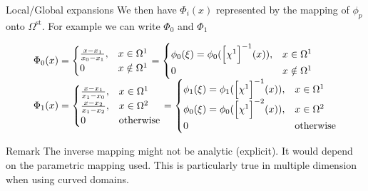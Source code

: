 \begin{frame}{Local/Global expansions}
  We then have $\Phi_i(x)$ represented by the mapping of $\phi_p$ onto $\Omega^{\text{st}}$. For example we can write $\Phi_0$ and $\Phi_1$
  
  \begin{equation}
    \label{eq:57}
    \begin{array}[c]{l}
      \Phi_0(x) =
    \begin{cases}
      \frac{x-x_1}{x_0-x_1}, & x \in \Omega^1\\
      0 & x \notin \Omega^1
    \end{cases}
    =
    \begin{cases}
      \phi_0(\xi) = \phi_0(\Big[ \chi^1\Big]^{-1} (x)), & x \in \Omega^1\\
      0 & x \notin \Omega^1
    \end{cases}\\
    \Phi_1(x) =
    \begin{cases}
      \frac{x-x_1}{x_1-x_0}, & x \in \Omega^1\\
      \frac{x-x_2}{x_1-x_2}, & x \in \Omega^2\\
      0 & \text{otherwise}
    \end{cases}
    =
    \begin{cases}
      \phi_1(\xi) = \phi_1(\Big[ \chi^1\Big]^{-1} (x)), & x \in \Omega^1\\
      \phi_0(\xi) = \phi_0(\Big[ \chi^1\Big]^{-2} (x)), & x \in \Omega^2\\
      0 & \text{otherwise}
    \end{cases}\\
    \end{array}
  \end{equation}

  \begin{block}{Remark}
    The inverse mapping might not be analytic (explicit). It would
    depend on the parametric mapping used. This is particularly true
    in multiple dimension when using curved domains.
  \end{block}


\end{frame}


